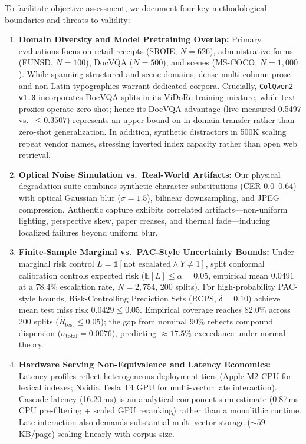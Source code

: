 To facilitate objective assessment, we document four key methodological boundaries and threats to validity:
\begin{enumerate}
    \setlength{\itemsep}{0pt}
    \setlength{\parskip}{0pt}
    \setlength{\parsep}{0pt}
    \setlength{\topsep}{1pt}
    \item \textbf{Domain Diversity and Model Pretraining Overlap:} Primary evaluations focus on retail receipts (SROIE, $N=626$), administrative forms (FUNSD, $N=100$), DocVQA ($N=500$), and scenes (MS-COCO, $N=1{,}000$). While spanning structured and scene domains, dense multi-column prose and non-Latin typographies warrant dedicated corpora. Crucially, \texttt{ColQwen2-v1.0} \cite{faysse2024colqwen2} incorporates DocVQA splits in its ViDoRe training mixture, while text proxies operate zero-shot; hence its DocVQA advantage (live measured 0.5497 vs.\ $\le 0.3507$) represents an upper bound on in-domain transfer rather than zero-shot generalization. In addition, synthetic distractors in 500K scaling repeat vendor names, stressing inverted index capacity rather than open web retrieval.
    \item \textbf{Optical Noise Simulation vs.\ Real-World Artifacts:} Our physical degradation suite combines synthetic character substitutions (CER $0.0$--$0.64$) with optical Gaussian blur ($\sigma=1.5$), bilinear downsampling, and JPEG compression. Authentic capture exhibits correlated artifacts---non-uniform lighting, perspective skew, paper creases, and thermal fade---inducing localized failures beyond uniform blur.
    \item \textbf{Finite-Sample Marginal vs.\ PAC-Style Uncertainty Bounds:} Under marginal risk control $L = \mathbf{1}[\text{not escalated} \land Y \ne 1]$, split conformal calibration controls expected risk ($\mathbb{E}[L] \le \alpha = 0.05$, empirical mean $0.0491$ at a 78.4\% escalation rate, $N=2{,}754$, 200 splits). For high-probability PAC-style bounds, Risk-Controlling Prediction Sets (RCPS, $\delta=0.10$) achieve mean test miss risk $0.0429 \le 0.05$. Empirical coverage reaches 82.0\% across 200 splits ($\hat{R}_{\text{test}} \le 0.05$); the gap from nominal 90\% reflects compound dispersion ($\sigma_{\text{total}} = 0.0076$), predicting $\approx 17.5\%$ exceedance under normal theory.
    \item \textbf{Hardware Serving Non-Equivalence and Latency Economics:} Latency profiles reflect heterogeneous deployment tiers (Apple M2 CPU for lexical indexes; Nvidia Tesla T4 GPU for multi-vector late interaction). Cascade latency (16.20\,ms) is an analytical component-sum estimate (0.87\,ms CPU pre-filtering + scaled GPU reranking) rather than a monolithic runtime. Late interaction also demands substantial multi-vector storage ($\sim 59$\,KB/page) scaling linearly with corpus size.
\end{enumerate}


